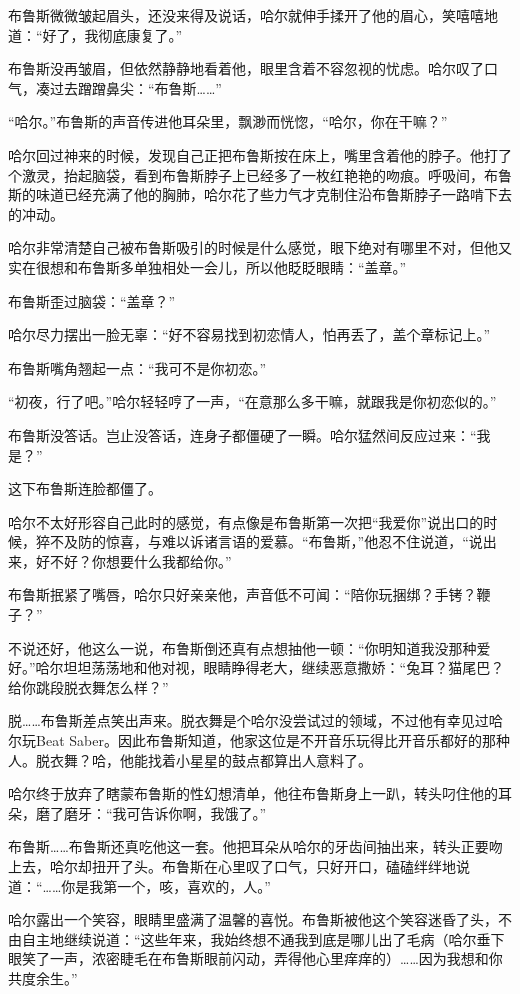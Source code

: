 \documentclass[../main]{subfiles}
\begin{document}
布鲁斯微微皱起眉头，还没来得及说话，哈尔就伸手揉开了他的眉心，笑嘻嘻地道：“好了，我彻底康复了。”

布鲁斯没再皱眉，但依然静静地看着他，眼里含着不容忽视的忧虑。哈尔叹了口气，凑过去蹭蹭鼻尖：“布鲁斯……”

“哈尔。”布鲁斯的声音传进他耳朵里，飘渺而恍惚，“哈尔，你在干嘛？”

哈尔回过神来的时候，发现自己正把布鲁斯按在床上，嘴里含着他的脖子。他打了个激灵，抬起脑袋，看到布鲁斯脖子上已经多了一枚红艳艳的吻痕。呼吸间，布鲁斯的味道已经充满了他的胸肺，哈尔花了些力气才克制住沿布鲁斯脖子一路啃下去的冲动。

哈尔非常清楚自己被布鲁斯吸引的时候是什么感觉，眼下绝对有哪里不对，但他又实在很想和布鲁斯多单独相处一会儿，所以他眨眨眼睛：“盖章。”

布鲁斯歪过脑袋：“盖章？”

哈尔尽力摆出一脸无辜：“好不容易找到初恋情人，怕再丢了，盖个章标记上。”

布鲁斯嘴角翘起一点：“我可不是你初恋。”

“初夜，行了吧。”哈尔轻轻哼了一声，“在意那么多干嘛，就跟我是你初恋似的。”

布鲁斯没答话。岂止没答话，连身子都僵硬了一瞬。哈尔猛然间反应过来：“我是？”

这下布鲁斯连脸都僵了。

哈尔不太好形容自己此时的感觉，有点像是布鲁斯第一次把“我爱你”说出口的时候，猝不及防的惊喜，与难以诉诸言语的爱慕。“布鲁斯，”他忍不住说道，“说出来，好不好？你想要什么我都给你。”

布鲁斯抿紧了嘴唇，哈尔只好亲亲他，声音低不可闻：“陪你玩捆绑？手铐？鞭子？”

不说还好，他这么一说，布鲁斯倒还真有点想抽他一顿：“你明知道我没那种爱好。”哈尔坦坦荡荡地和他对视，眼睛睁得老大，继续恶意撒娇：“兔耳？猫尾巴？给你跳段脱衣舞怎么样？”

脱……布鲁斯差点笑出声来。脱衣舞是个哈尔没尝试过的领域，不过他有幸见过哈尔玩Beat
Saber。因此布鲁斯知道，他家这位是不开音乐玩得比开音乐都好的那种人。脱衣舞？哈，他能找着小星星的鼓点都算出人意料了。

哈尔终于放弃了瞎蒙布鲁斯的性幻想清单，他往布鲁斯身上一趴，转头叼住他的耳朵，磨了磨牙：“我可告诉你啊，我饿了。”

布鲁斯……布鲁斯还真吃他这一套。他把耳朵从哈尔的牙齿间抽出来，转头正要吻上去，哈尔却扭开了头。布鲁斯在心里叹了口气，只好开口，磕磕绊绊地说道：“……你是我第一个，咳，喜欢的，人。”

哈尔露出一个笑容，眼睛里盛满了温馨的喜悦。布鲁斯被他这个笑容迷昏了头，不由自主地继续说道：“这些年来，我始终想不通我到底是哪儿出了毛病（哈尔垂下眼笑了一声，浓密睫毛在布鲁斯眼前闪动，弄得他心里痒痒的）……因为我想和你共度余生。”
\end{document}
